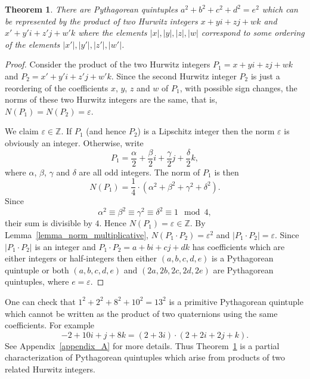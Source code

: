 \documentclass[12pt,table]{article}
\newtheorem{theorem}{Theorem}[section]
\theoremstyle{definition}
\theoremstyle{remark}
\newcommand{\Zzz}{\mathbb Z}
\numberwithin{equation}{section}
\begin{document}
\begin{theorem}
\label{theorem_as_products}
There are Pythagorean quintuples 
$a^2 + b^2 +c^2 +d^2 = e^2$ which can be represented
by the product of two Hurwitz integers
$x + yi + zj + wk$ and
$x' + y'i + z'j + w'k$
where
the elements
$|x|, |y|, |z|, |w|$ correspond
to some ordering of the elements
$|x'|, |y'|, |z'|, |w'|$.
\end{theorem}
\begin{proof}
Consider the product of the two Hurwitz integers
$P_1 = x + yi + zj + wk$ and
$P_2 = x' + y'i + z'j + w'k$.  
Since the second Hurwitz integer $P_2$ 
is just a reordering of
the coefficients $x$, $y$, $z$ and $w$ of $P_1$, 
with possible sign changes,
the norms  of these two Hurwitz integers
are the same, that is,
$N(P_1) = N(P_2) = \varepsilon$.


We claim $\varepsilon \in \Zzz$.  If $P_1$ (and hence $P_2$)
is a Lipschitz integer then 
the norm $\varepsilon$ is obviously an integer.
Otherwise, write 
\[
  P_1 = \frac{\alpha}{2} + \frac{\beta}{2} i + 
        \frac{\gamma}{2} j + \frac{\delta}{2} k,
\]
where
$\alpha$, $\beta$, $\gamma$ and $\delta$ are all odd integers.
The norm of $P_1$ is then
\[
     N(P_1) = \frac{1}{4} \cdot 
              (\alpha^2 + \beta^2 + \gamma^2 + \delta^2).
\]
Since
\[
  \alpha^2 \equiv \beta^2 \equiv \gamma^2 \equiv \delta^2 \equiv 1 \mod 4,
\]
their sum is divisible by $4$.
Hence $N(P_1) = \varepsilon \in \Zzz$.
By Lemma~\ref{lemma_norm_multiplicative},
$N(P_1 \cdot P_2) = \varepsilon^2$
and 
$|P_1 \cdot P_2| = \varepsilon$.
Since $|P_1 \cdot P_2|$ is an integer and 
$P_1 \cdot P_2 = a + bi + cj + dk$ has
coefficients which are either integers or half-integers 
then
either
$(a,b,c,d,e)$ is a Pythagorean quintuple
or
both
$(a,b,c,d,e)$ and
$(2a,2b,2c,2d,2e)$ are Pythagorean quintuples,
where
$e = \varepsilon$.
\end{proof}





One can check that 
$1^2+ 2^2+ 8^2+ 10^2  = 13^2$
is a primitive Pythagorean quintuple which
cannot be written as the product of two quaternions
using the same coefficients.
For example
\[
  -2 + 10 i + j + 8k = (2 + 3i) \cdot (2 + 2i + 2j + k).
\]
See Appendix~\ref{appendix_A} for more details.
Thus Theorem~\ref{theorem_as_products} 
is a partial characterization of Pythagorean quintuples 
which arise from products of two related Hurwitz integers.
\end{document}
